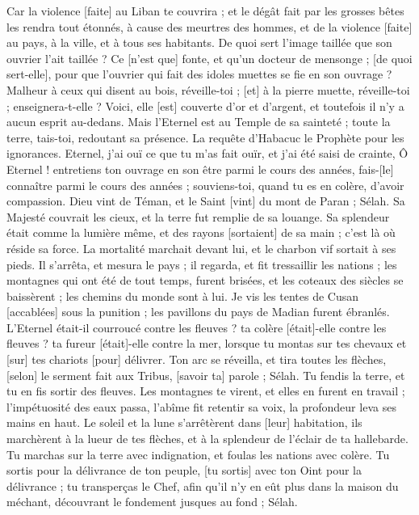 \begin{multicols}{2}
Car la violence [faite] au Liban te couvrira ; et le dégât fait par les grosses bêtes les rendra tout étonnés, à cause des meurtres des hommes, et de la violence [faite] au pays, à la ville, et à tous ses habitants.
De quoi sert l'image taillée que son ouvrier l'ait taillée ? Ce [n'est que] fonte, et qu'un docteur de mensonge ; [de quoi sert-elle], pour que l'ouvrier qui fait des idoles muettes se fie en son ouvrage ?
Malheur à ceux qui disent au bois, réveille-toi ; [et] à la pierre muette, réveille-toi ; enseignera-t-elle ? Voici, elle [est] couverte d'or et d'argent, et toutefois il n'y a aucun esprit au-dedans.
Mais l'Eternel est au Temple de sa sainteté ; toute la terre, tais-toi, redoutant sa présence.
\VerseOne{}La requête d'Habacuc le Prophète pour les ignorances.
Eternel, j'ai ouï ce que tu m'as fait ouïr, et j'ai été saisi de crainte, Ô Eternel ! entretiens ton ouvrage en son être parmi le cours des années, fais-[le] connaître parmi le cours des années ; souviens-toi, quand tu es en colère, d'avoir compassion.
Dieu vint de Téman, et le Saint [vint] du mont de Paran ; Sélah. Sa Majesté couvrait les cieux, et la terre fut remplie de sa louange.
Sa splendeur était comme la lumière même, et des rayons [sortaient] de sa main ; c'est là où réside sa force.
La mortalité marchait devant lui, et le charbon vif sortait à ses pieds.
Il s'arrêta, et mesura le pays ; il regarda, et fit tressaillir les nations ; les montagnes qui ont été de tout temps, furent brisées, et les coteaux des siècles se baissèrent ; les chemins du monde sont à lui.
Je vis les tentes de Cusan [accablées] sous la punition ; les pavillons du pays de Madian furent ébranlés.
L'Eternel était-il courroucé contre les fleuves ? ta colère [était]-elle contre les fleuves ? ta fureur [était]-elle contre la mer, lorsque tu montas sur tes chevaux et [sur] tes chariots [pour] délivrer.
Ton arc se réveilla, et tira toutes les flèches, [selon] le serment fait aux Tribus, [savoir ta] parole ; Sélah. Tu fendis la terre, et tu en fis sortir des fleuves.
Les montagnes te virent, et elles en furent en travail ; l'impétuosité des eaux passa, l'abîme fit retentir sa voix, la profondeur leva ses mains en haut.
Le soleil et la lune s'arrêtèrent dans [leur] habitation, ils marchèrent à la lueur de tes flèches, et à la splendeur de l'éclair de ta hallebarde.
Tu marchas sur la terre avec indignation, et foulas les nations avec colère.
Tu sortis pour la délivrance de ton peuple, [tu sortis] avec ton Oint pour la délivrance ; tu transperças le Chef, afin qu'il n'y en eût plus dans la maison du méchant, découvrant le fondement jusques au fond ; Sélah.

\end{multicols}

